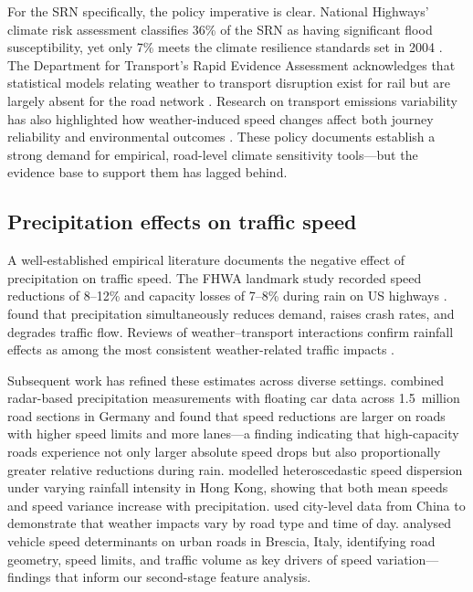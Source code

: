 \documentclass[review]{elsarticle}
\begin{document}
For the SRN specifically, the policy imperative is clear. National Highways' climate risk assessment classifies 36\% of the SRN as having significant flood susceptibility, yet only 7\% meets the climate resilience standards set in 2004 \citep{nce2026srn,nh2024climate}. The Department for Transport's Rapid Evidence Assessment acknowledges that statistical models relating weather to transport disruption exist for rail but are largely absent for the road network \citep{dft2024rea}. Research on transport emissions variability has also highlighted how weather-induced speed changes affect both journey reliability and environmental outcomes \citep{wan2025variability}. These policy documents establish a strong demand for empirical, road-level climate sensitivity tools---but the evidence base to support them has lagged behind.

\subsection{Precipitation effects on traffic speed}
\label{sec:lit:precip}

A well-established empirical literature documents the negative effect of precipitation on traffic speed. The FHWA landmark study recorded speed reductions of 8--12\% and capacity losses of 7--8\% during rain on US highways \citep{hranac2006empirical}. \citet{maze2006weather} found that precipitation simultaneously reduces demand, raises crash rates, and degrades traffic flow. Reviews of weather--transport interactions confirm rainfall effects as among the most consistent weather-related traffic impacts \citep{koetse2009impact,elfaouzi2012effects}.

Subsequent work has refined these estimates across diverse settings. \citet{becker2026rainfall} combined radar-based precipitation measurements with floating car data across 1.5~million road sections in Germany and found that speed reductions are larger on roads with higher speed limits and more lanes---a finding indicating that high-capacity roads experience not only larger absolute speed drops but also proportionally greater relative reductions during rain. \citet{cai2016rainfall} modelled heteroscedastic speed dispersion under varying rainfall intensity in Hong Kong, showing that both mean speeds and speed variance increase with precipitation. \citet{bi2022weather} used city-level data from China to demonstrate that weather impacts vary by road type and time of day. \citet{raccagni2024urban} analysed vehicle speed determinants on urban roads in Brescia, Italy, identifying road geometry, speed limits, and traffic volume as key drivers of speed variation---findings that inform our second-stage feature analysis.
\end{document}
